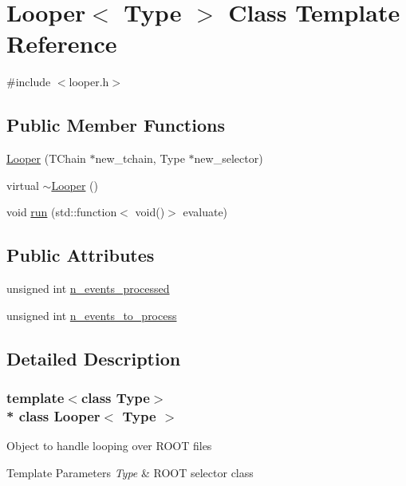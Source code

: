 \hypertarget{classLooper}{}\section{Looper$<$ Type $>$ Class Template Reference}
\label{classLooper}


{\ttfamily \#include $<$looper.\+h$>$}

\subsection*{Public Member Functions}
\begin{DoxyCompactItemize}
\item 
\hyperlink{classLooper_a1328b8985a65807d46cbc23532917fd5}{Looper} (T\+Chain $\ast$new\+\_\+tchain, Type $\ast$new\+\_\+selector)
\item 
virtual \hyperlink{classLooper_a2ab3ca481534b316d9844ada765b74b3}{$\sim$\+Looper} ()
\item 
void \hyperlink{classLooper_abfa564ca48778da1f58c8a6444ddd463}{run} (std\+::function$<$ void()$>$ evaluate)
\end{DoxyCompactItemize}
\subsection*{Public Attributes}
\begin{DoxyCompactItemize}
\item 
unsigned int \hyperlink{classLooper_a97e473848469359cd33cd23771e0eb28}{n\+\_\+events\+\_\+processed}
\item 
unsigned int \hyperlink{classLooper_a666747cb782bd6082452a6d5ac18f94f}{n\+\_\+events\+\_\+to\+\_\+process}
\end{DoxyCompactItemize}


\subsection{Detailed Description}
\subsubsection*{template$<$class Type$>$\\*
class Looper$<$ Type $>$}

Object to handle looping over R\+O\+OT files 
\begin{DoxyTemplParams}{Template Parameters}
{\em Type} & R\+O\+OT selector class \\
\hline
\end{DoxyTemplParams}


